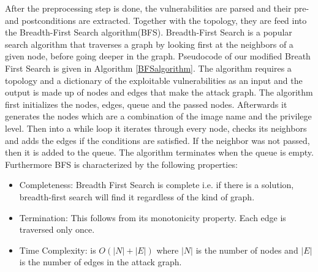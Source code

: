 After the preprocessing step is done, the vulnerabilities are parsed and their pre- and postconditions are extracted. Together with the topology, they are feed into the Breadth-First Search algorithm(BFS).
Breadth-First Search is a popular search algorithm that traverses a graph by looking first at the neighbors of a given node, before going deeper in the graph. Pseudocode of our modified Breath First Search is given in Algorithm \ref{BFSalgorithm}. The algorithm requires a topology and a dictionary of the exploitable vulnerabilities as an input and the output is made up of nodes and edges that make the attack graph. The algorithm first initializes the nodes, edges, queue and the passed nodes. Afterwards it generates the nodes which are a combination of the image name and the privilege level. Then into a while loop it iterates through every node, checks its neighbors and adds the edges if the conditions are satisfied. If the neighbor was not passed, then it is added to the queue. The algorithm terminates when the queue is empty. Furthermore BFS is characterized by the following properties:
	
	\begin{itemize}
		\item Completeness: Breadth First Search is complete i.e. if there is a solution, breadth-first search will find it regardless of the kind of graph.
		\item Termination: This follows from its monotonicity property. Each edge is traversed only once.
		\item Time Complexity: is $O(|N| + |E|)$ where $|N|$ is the number of nodes and $|E|$ is the number of edges in the attack graph.
	\end{itemize}
